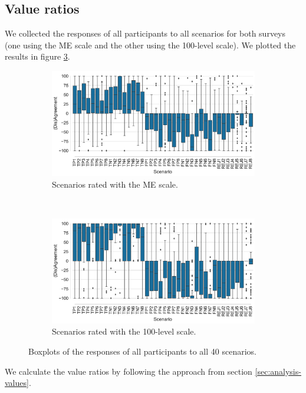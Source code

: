 \subsection{Value ratios}
\label{sec:results-value-ratios}
We collected the responses of all participants to all scenarios for both surveys (one using the ME scale and the other using the 100-level scale).
%
We plotted the results in figure \ref{fig:boxplots}.
%
\begin{figure}
    \centering
    \begin{subfigure}[b]{.9\textwidth}
        \centering
        \includegraphics[width=\linewidth]{Figures/boxplots-ME.pdf}
        \caption{Scenarios rated with the ME scale.}
        \label{fig:boxplots-me}
    \end{subfigure}
    \\
    \begin{subfigure}[b]{.9\textwidth}
        \centering
        \includegraphics[width=\linewidth]{Figures/boxplots-100-level.pdf}
        \caption{Scenarios rated with the 100-level scale.}
        \label{fig:boxplots-100-level}
    \end{subfigure}
    \caption{Boxplots of the responses of all participants to all 40 scenarios.}
    \label{fig:boxplots}
\end{figure}
We calculate the value ratios by following the approach from section \ref{sec:analysis-values}.
%

